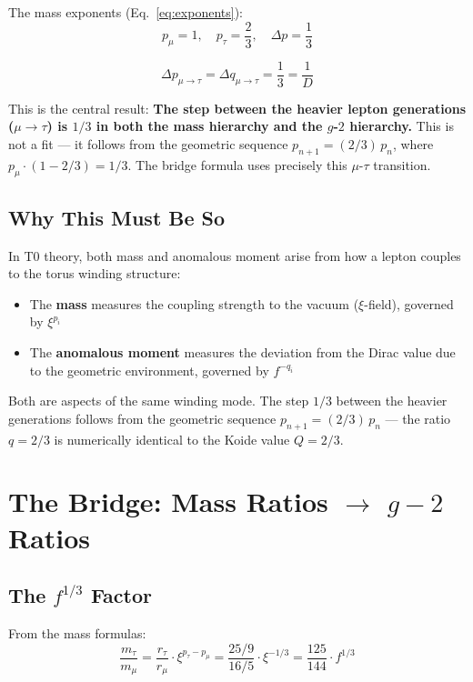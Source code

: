 The mass exponents (Eq.~\ref{eq:exponents}):
\begin{equation}
	p_\mu = 1, \quad p_\tau = \frac{2}{3}, \quad \Delta p = \frac{1}{3}
\end{equation}

\begin{equation}
	\boxed{\Delta p_{\mu\to\tau} = \Delta q_{\mu\to\tau} = \frac{1}{3} = \frac{1}{D}}
\end{equation}

This is the central result: \textbf{The step between the heavier lepton generations ($\mu\to\tau$) is $1/3$ in both the mass hierarchy and the $g$-$2$ hierarchy.} This is not a fit --- it follows from the geometric sequence $p_{n+1} = (2/3)\,p_n$, where $p_\mu \cdot (1-2/3) = 1/3$. The bridge formula uses precisely this $\mu$-$\tau$ transition.

\subsection{Why This Must Be So}

In T0 theory, both mass and anomalous moment arise from how a lepton couples to the torus winding structure:
\begin{itemize}
	\item The \textbf{mass} measures the coupling strength to the vacuum ($\xi$-field), governed by $\xi^{p_i}$
	\item The \textbf{anomalous moment} measures the deviation from the Dirac value due to the geometric environment, governed by $f^{-q_i}$
\end{itemize}
Both are aspects of the same winding mode. The step $1/3$ between
the heavier generations follows from the geometric sequence
$p_{n+1} = (2/3)\,p_n$ — the ratio $q = 2/3$ is numerically identical
to the Koide value $Q = 2/3$.

\section{The Bridge: Mass Ratios $\to$ $g-2$ Ratios}

\subsection{The $f^{1/3}$ Factor}

From the mass formulas:
\begin{equation}
	\frac{m_\tau}{m_\mu} = \frac{r_\tau}{r_\mu} \cdot \xi^{p_\tau - p_\mu} 
	= \frac{25/9}{16/5} \cdot \xi^{-1/3} = \frac{125}{144} \cdot f^{1/3}
	\label{eq:massratio}
\end{equation}


